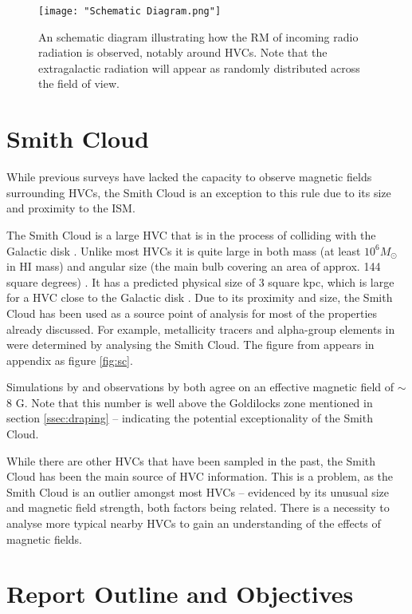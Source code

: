 \begin{figure}
    \texttt{[image: "Schematic Diagram.png"]}
    \centering
    \caption{An schematic diagram illustrating how the RM of incoming radio radiation is observed, notably around HVCs. Note that the extragalactic radiation will appear as randomly distributed across the field of view.}
    \label{fig:schema}
\end{figure}

\section{Smith Cloud}
\label{sec:sc}

While previous surveys have lacked the capacity to observe magnetic fields surrounding HVCs, the Smith Cloud is an exception to this rule due to its size and proximity to the ISM.

The Smith Cloud is a large HVC that is in the process of colliding with the Galactic disk \citep{ID28, ID64, ID35}. Unlike most HVCs it is quite large in both mass (at least $10^6 M_{\odot}$ in HI mass) and angular size (the main bulb covering an area of approx. 144 square degrees) \citep{ID28, ID64, ID35}. It has a predicted physical size of 3 square kpc, which is large for a HVC close to the Galactic disk \citep{ID28}. Due to its proximity and size, the Smith Cloud has been used as a source point of analysis for most of the properties already discussed. For example, metallicity tracers and alpha-group elements in \cite{ID48, ID49} were determined by analysing the Smith Cloud. The figure from \cite{ID28} appears in appendix as figure \ref{fig:sc}.


Simulations by \cite{ID23} and observations by \cite{ID26} both agree on an effective magnetic field of $\sim$8 {\textmu}G. Note that this number is well above the Goldilocks zone mentioned in section \ref{ssec:draping} – indicating the potential exceptionality of the Smith Cloud.


While there are other HVCs that have been sampled in the past, the Smith Cloud has been the main source of HVC information. This is a problem, as the Smith Cloud is an outlier amongst most HVCs – evidenced by its unusual size and magnetic field strength, both factors being related. There is a necessity to analyse more typical nearby HVCs to gain an understanding of the effects of magnetic fields.

\section{Report Outline and Objectives}
\label{sec:outline}

